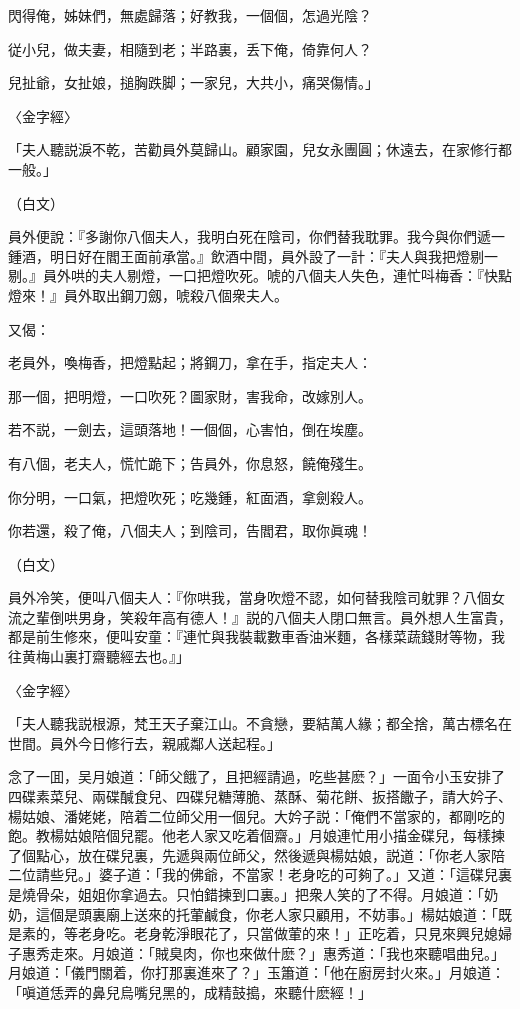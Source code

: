 閃得俺，姊妹們，無處歸落；好教我，一個個，怎過光陰？

従小兒，做夫妻，相隨到老；半路裏，丢下俺，倚靠何人？

兒扯爺，女扯娘，搥胸跌脚；一家兒，大共小，痛哭傷情。」

〈金字經〉

「夫人聽説淚不乾，苦勸員外莫歸山。顧家園，兒女永團圓；休遠去，在家修行都一般。」

（白文）

員外便說：『多謝你八個夫人，我明白死在陰司，你們替我耽罪。我今與你們遞一鍾酒，明日好在閻王面前承當。』飲酒中間，員外設了一計：『夫人與我把燈剔一剔。』員外哄的夫人剔燈，一口把燈吹死。唬的八個夫人失色，連忙呌梅香：『快點燈來！』員外取出鋼刀劔，唬殺八個衆夫人。

又偈：

老員外，喚梅香，把燈點起；將鋼刀，拿在手，指定夫人：

那一個，把明燈，一口吹死？圖家財，害我命，改嫁別人。

若不説，一劍去，這頭落地！一個個，心害怕，倒在埃塵。

有八個，老夫人，慌忙跪下；告員外，你息怒，饒俺殘生。

你分明，一口氣，把燈吹死；吃幾鍾，紅面酒，拿劍殺人。

你若還，殺了俺，八個夫人；到陰司，告閻君，取你眞魂！

（白文）

員外冷笑，便叫八個夫人：『你哄我，當身吹燈不認，如何替我陰司躭罪？八個女流之輩倒哄男身，笑殺年高有德人！』説的八個夫人閉口無言。員外想人生富貴，都是前生修來，便叫安童：『連忙與我裝載數車香油米麵，各樣菜蔬錢財等物，我往黄梅山裏打齋聽經去也。』」

〈金字經〉

「夫人聽我説根源，梵王天子棄江山。不貪戀，要結萬人緣；都全捨，萬古標名在世間。員外今日修行去，親戚鄰人送起程。」

念了一囬，吴月娘道：「師父餓了，且把經請過，吃些甚麽？」一面令小玉安排了四碟素菜兒、兩碟醎食兒、四碟兒糖薄脆、蒸酥、菊花餅、扳搭饊子，請大妗子、楊姑娘、潘姥姥，陪着二位師父用一個兒。大妗子説：「俺們不當家的，都剛吃的飽。教楊姑娘陪個兒罷。他老人家又吃着個齋。」月娘連忙用小描金碟兒，每樣揀了個點心，放在碟兒裏，先遞與兩位師父，然後遞與楊姑娘，説道：「你老人家陪二位請些兒。」婆子道：「我的佛爺，不當家！老身吃的可夠了。」又道：「這碟兒裏是燒骨朵，姐姐你拿過去。只怕錯揀到口裏。」把衆人笑的了不得。月娘道：「奶奶，這個是頭裏廟上送來的托葷鹹食，你老人家只顧用，不妨事。」楊姑娘道：「既是素的，等老身吃。老身乾淨眼花了，只當做葷的來！」正吃着，只見來興兒媳婦子惠秀走來。月娘道：「賊臭肉，你也來做什麽？」惠秀道：「我也來聽唱曲兒。」月娘道：「儀門關着，你打那裏進來了？」玉簫道：「他在廚房封火來。」月娘道：「嗔道恁弄的鼻兒烏嘴兒黑的，成精鼓搗，來聽什麽經！」

